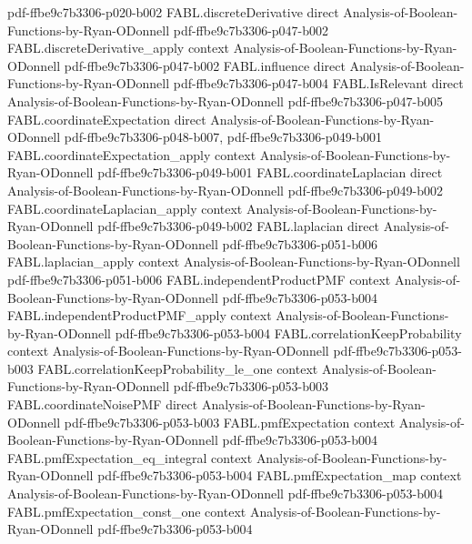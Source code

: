 \begin{theorem}
  {pdf-ffbe9c7b3306-p020-b002}
\proofstep
  {FABL.discreteDerivative}
  {direct}
  {Analysis-of-Boolean-Functions-by-Ryan-ODonnell}
  {pdf-ffbe9c7b3306-p047-b002}
\proofstep
  {FABL.discreteDerivative_apply}
  {context}
  {Analysis-of-Boolean-Functions-by-Ryan-ODonnell}
  {pdf-ffbe9c7b3306-p047-b002}
\proofstep
  {FABL.influence}
  {direct}
  {Analysis-of-Boolean-Functions-by-Ryan-ODonnell}
  {pdf-ffbe9c7b3306-p047-b004}
\proofstep
  {FABL.IsRelevant}
  {direct}
  {Analysis-of-Boolean-Functions-by-Ryan-ODonnell}
  {pdf-ffbe9c7b3306-p047-b005}
\proofstep
  {FABL.coordinateExpectation}
  {direct}
  {Analysis-of-Boolean-Functions-by-Ryan-ODonnell}
  {pdf-ffbe9c7b3306-p048-b007,
    pdf-ffbe9c7b3306-p049-b001}
\proofstep
  {FABL.coordinateExpectation_apply}
  {context}
  {Analysis-of-Boolean-Functions-by-Ryan-ODonnell}
  {pdf-ffbe9c7b3306-p049-b001}
\proofstep
  {FABL.coordinateLaplacian}
  {direct}
  {Analysis-of-Boolean-Functions-by-Ryan-ODonnell}
  {pdf-ffbe9c7b3306-p049-b002}
\proofstep
  {FABL.coordinateLaplacian_apply}
  {context}
  {Analysis-of-Boolean-Functions-by-Ryan-ODonnell}
  {pdf-ffbe9c7b3306-p049-b002}
\proofstep
  {FABL.laplacian}
  {direct}
  {Analysis-of-Boolean-Functions-by-Ryan-ODonnell}
  {pdf-ffbe9c7b3306-p051-b006}
\proofstep
  {FABL.laplacian_apply}
  {context}
  {Analysis-of-Boolean-Functions-by-Ryan-ODonnell}
  {pdf-ffbe9c7b3306-p051-b006}
\proofstep
  {FABL.independentProductPMF}
  {context}
  {Analysis-of-Boolean-Functions-by-Ryan-ODonnell}
  {pdf-ffbe9c7b3306-p053-b004}
\proofstep
  {FABL.independentProductPMF_apply}
  {context}
  {Analysis-of-Boolean-Functions-by-Ryan-ODonnell}
  {pdf-ffbe9c7b3306-p053-b004}
\proofstep
  {FABL.correlationKeepProbability}
  {context}
  {Analysis-of-Boolean-Functions-by-Ryan-ODonnell}
  {pdf-ffbe9c7b3306-p053-b003}
\proofstep
  {FABL.correlationKeepProbability_le_one}
  {context}
  {Analysis-of-Boolean-Functions-by-Ryan-ODonnell}
  {pdf-ffbe9c7b3306-p053-b003}
\proofstep
  {FABL.coordinateNoisePMF}
  {direct}
  {Analysis-of-Boolean-Functions-by-Ryan-ODonnell}
  {pdf-ffbe9c7b3306-p053-b003}
\proofstep
  {FABL.pmfExpectation}
  {context}
  {Analysis-of-Boolean-Functions-by-Ryan-ODonnell}
  {pdf-ffbe9c7b3306-p053-b004}
\proofstep
  {FABL.pmfExpectation_eq_integral}
  {context}
  {Analysis-of-Boolean-Functions-by-Ryan-ODonnell}
  {pdf-ffbe9c7b3306-p053-b004}
\proofstep
  {FABL.pmfExpectation_map}
  {context}
  {Analysis-of-Boolean-Functions-by-Ryan-ODonnell}
  {pdf-ffbe9c7b3306-p053-b004}
\proofstep
  {FABL.pmfExpectation_const_one}
  {context}
  {Analysis-of-Boolean-Functions-by-Ryan-ODonnell}
  {pdf-ffbe9c7b3306-p053-b004}

\end{theorem}

